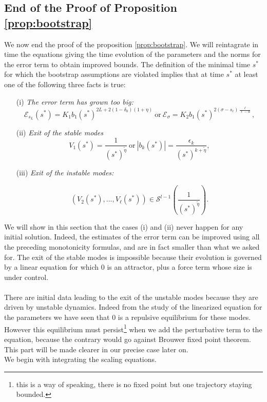 \documentclass[11pt,a4paper,reqno]{amsart}
\theoremstyle{remark}
\numberwithin{equation}{section}
\begin{document}
\subsection{End of the Proof of Proposition \ref{prop:bootstrap}}
We now end the proof of the proposition \ref{prop:bootstrap}. We will reintagrate in time the equations giving the time evolution of the parameters and the norms for the error term to obtain improved bounds. The definition of the minimal time $s^*$ for which the bootstrap assumptions are violated implies that at time $s^*$ at least one of the following three facts is true:
\begin{itemize}
\item[(i)] \emph{The error term has grown too big:}
$$
\mathcal{E}_{s_L}(s^*)=K_1b_1(s^*)^{2L+2(1-\delta_0)(1+\eta)} \ \text{or} \ \mathcal{E}_{\sigma}= K_2b_1(s^*)^{2(\sigma-s_c)\frac{\ell}{\ell-\alpha}} ,
$$
\item[(ii)] \emph{Exit of the stable modes}
$$
V_1(s^*)=\frac{1}{(s^*)^{\tilde{\eta}}} \ \text{or} \ |b_k(s^*)|=\frac{\epsilon_k}{(s^{*})^{k+\tilde{\eta}}} ,
$$
\item[(iii)] \emph{Exit of the instable modes:}

$$
(V_2(s^*),...,V_{\ell}(s^*))\in \mathcal{S}^{l-1}\left(\frac{1}{(s^*)^{\tilde{\eta}}}\right) .
$$

\end{itemize}
We will show in this section that the cases (i) and (ii) never happen for any initial solution. Indeed, the estimates of the error term can be improved using all the preceding monotonicity formulas, and are in fact smaller than what we asked for. The exit of the stable modes is impossible because their evolution is governed by a linear equation for which $0$ is an attractor, plus a force term whose size is under control.\\
\\
There are initial data leading to the exit of the unstable modes because they are driven by unstable dynamics. Indeed from the study of the linearized equation for the parameters we have seen that $0$ is a repulsive equilibrium for these modes. However this equilibrium must persist\footnote{this is a way of speaking, there is no fixed point but one trajectory staying bounded.} when we add the perturbative term to the equation, because the contrary would go against Brouwer fixed point theorem. This part will be made clearer in our precise case later on.\\

We begin with integrating the scaling equations.
\end{document}
